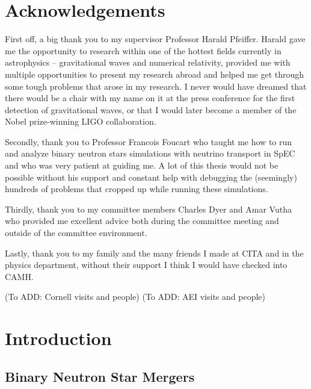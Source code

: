 \documentclass{ut-thesis}
\begin{document}



\section{Acknowledgements}

First off, a big thank you to my supervisor Professor Harald Pfeiffer. Harald gave me the opportunity to research within one of the hottest fields currently in astrophysics -- gravitational waves and numerical relativity, provided me with multiple opportunities to present my research abroad and helped me get through some tough problems that arose in my research. I never would have dreamed that there would be a chair with my name on it at the press conference for the first detection of gravitational waves, or that I would later become a member of the Nobel prize-winning LIGO collaboration. 

Secondly, thank you to Professor Francois Foucart who taught me how to run and analyze binary neutron stars simulations with neutrino transport in SpEC and who was very patient at guiding me. A lot of this thesis would not be possible without his support and constant help with debugging the (seemingly) hundreds of problems that cropped up while running these simulations.

Thirdly, thank you to my committee members Charles Dyer and Amar Vutha who provided me excellent advice both during the committee meeting and outside of the committee environment.

Lastly, thank you to my family and the many friends I made at CITA and in the physics department, without their support I think I would have checked into CAMH.

(To ADD: Cornell visits and people) 
(To ADD: AEI visits and people)

\section{Introduction}


\subsection{Binary Neutron Star Mergers}
\end{document}
